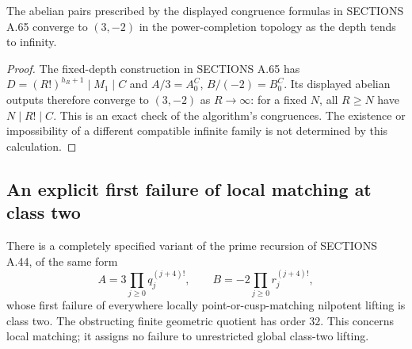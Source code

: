 \begin{proposition}
\label{prop:ghost-a65-limit}
The abelian pairs prescribed by the displayed congruence formulas
in SECTIONS A.65 converge to \((3,-2)\) in the power-completion
topology as the depth tends to infinity.
\end{proposition}
\begin{proof}
The fixed-depth construction in SECTIONS A.65 has
\(D=(R!)^{h_R+1}\mid M_1\mid C\) and
\(A/3=A_0^C\), \(B/(-2)=B_0^C\). Its displayed abelian outputs
therefore converge to \((3,-2)\) as \(R\to\infty\): for a
fixed \(N\), all \(R\ge N\) have \(N\mid R!\mid C\).
This is an exact check of the algorithm's congruences. The
existence or impossibility of a different compatible infinite
family is not determined by this calculation.
\end{proof}

\subsection{An explicit first failure of local matching at class two}
\begin{theorem}
\label{thm:ghost-factorial-selmer32}
There is a completely specified variant of the prime recursion of
SECTIONS A.44, of the same form
\[
 A=3\prod_{j\ge0}q_j^{(j+4)!},\qquad
 B=-2\prod_{j\ge0}r_j^{(j+4)!},
\]
whose first failure of everywhere locally point-or-cusp-matching
nilpotent lifting is class two. The obstructing finite geometric
quotient has order \(32\). This concerns local matching; it
assigns no failure to unrestricted global class-two lifting.
\end{theorem}

